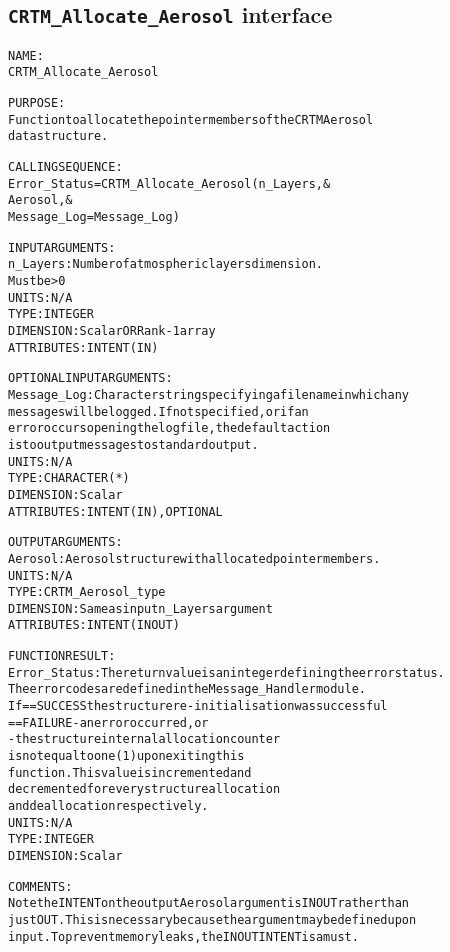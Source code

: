 \subsection{\texttt{CRTM\_Allocate\_Aerosol} interface}
  \label{sec:CRTM_Allocate_Aerosol_interface}
  \begin{alltt}
 
  NAME:
        CRTM_Allocate_Aerosol
  
  PURPOSE:
        Function to allocate the pointer members of the CRTM Aerosol
        data structure.
 
  CALLING SEQUENCE:
        Error_Status = CRTM_Allocate_Aerosol( n_Layers               , &
                                              Aerosol                , &
                                              Message_Log=Message_Log  )
 
  INPUT ARGUMENTS:
          n_Layers:   Number of atmospheric layers dimension.
                      Must be > 0
                      UNITS:      N/A
                      TYPE:       INTEGER
                      DIMENSION:  Scalar OR Rank-1 array
                      ATTRIBUTES: INTENT(IN)
 
  OPTIONAL INPUT ARGUMENTS:
        Message_Log:  Character string specifying a filename in which any
                      messages will be logged. If not specified, or if an
                      error occurs opening the log file, the default action
                      is to output messages to standard output.
                      UNITS:      N/A
                      TYPE:       CHARACTER(*)
                      DIMENSION:  Scalar
                      ATTRIBUTES: INTENT(IN), OPTIONAL
 
  OUTPUT ARGUMENTS:
        Aerosol:      Aerosol structure with allocated pointer members.
                      UNITS:      N/A
                      TYPE:       CRTM_Aerosol_type
                      DIMENSION:  Same as input n_Layers argument
                      ATTRIBUTES: INTENT(IN OUT)
 
 
  FUNCTION RESULT:
        Error_Status: The return value is an integer defining the error status.
                      The error codes are defined in the Message_Handler module.
                      If == SUCCESS the structure re-initialisation was successful
                         == FAILURE - an error occurred, or
                                    - the structure internal allocation counter
                                      is not equal to one (1) upon exiting this
                                      function. This value is incremented and
                                      decremented for every structure allocation
                                      and deallocation respectively.
                      UNITS:      N/A
                      TYPE:       INTEGER
                      DIMENSION:  Scalar
 
  COMMENTS:
        Note the INTENT on the output Aerosol argument is IN OUT rather than
        just OUT. This is necessary because the argument may be defined upon
        input. To prevent memory leaks, the IN OUT INTENT is a must.
 
  \end{alltt}
